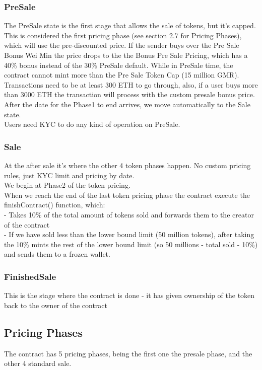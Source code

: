 \documentclass[11pt]{article} %
\begin{document}
\subsubsection{PreSale}
The PreSale state is the first stage that allows the sale of tokens, but it's capped. This is considered the first pricing phase (see section 2.7 for Pricing Phases), which will use the pre-discounted price. If the sender buys over the Pre Sale Bonus Wei Min the price drops to the the Bonus Pre Sale Pricing, which has a 40\% bonus instead of the 30\% PreSale default.
While in PreSale time, the contract cannot mint more than the Pre Sale Token Cap (15 million GMR). \\
Transactions need to be at least 300 ETH to go through, also, if a user buys more than 3000 ETH the transaction will process with the custom presale bonus price.\\
After the date for the Phase1 to end arrives, we move automatically to the Sale state.\\
Users need KYC to do any kind of operation on PreSale.
 
\subsubsection{Sale}
At the after sale it's where the other 4 token phases happen. No custom pricing rules, just KYC limit and pricing by date.\\
We begin at Phase2 of the token pricing.\\
When we reach the end of the last token pricing phase the contract execute the finishContract() function, which:\\
- Takes 10\% of the total amount of tokens sold and forwards them to the creator of the contract\\
- If we have sold less than the lower bound limit (50 million tokens), after taking the 10\% mints the rest of the lower bound limit (so 50 millions - total sold - 10\%) and sends them to a frozen wallet. 

\subsubsection{FinishedSale}
This is the stage where the contract is done - it has given ownership of the token back to the owner of the contract

\subsection{Pricing Phases}
The contract has 5 pricing phases, being the first one the presale phase, and the other 4 standard sale.
\end{document}
